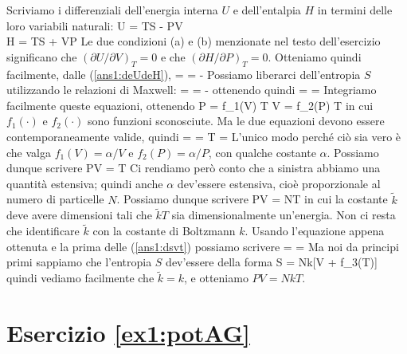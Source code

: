 Scriviamo i differenziali dell'energia interna $U$ e dell'entalpia $H$ in termini delle loro variabili naturali:
\bea
\label{ans1:deUdeH}
\de U = T\de S - P\de V \nonumber \\
\de H = T\de S + V\de P
\eea
Le due condizioni (a) e (b) menzionate nel testo dell'esercizio significano che $(\partial U/\partial V)_T = 0$ e che $(\partial H/\partial P)_T = 0$. Otteniamo quindi facilmente, dalle (\ref{ans1:deUdeH}),
\be
\label{ans1:dsvt}
 =  \quad\quad\quad {} = -
\ee
Possiamo liberarci dell'entropia $S$ utilizzando le relazioni di Maxwell:
\be
{} =  \quad\quad\quad {} = -
\ee
ottenendo quindi
\be
{} =  \quad\quad\quad {} = 
\ee
Integriamo facilmente queste equazioni, ottenendo
\be
P = f_1(V) T \quad\quad\quad V = f_2(P) T
\ee
in cui $f_1(\cdot)$ e $f_2(\cdot)$ sono funzioni sconosciute. Ma le due equazioni devono essere contemporaneamente valide, quindi
\be
{} =  = T = 
\ee
L'unico modo perché ciò sia vero è che valga $f_1(V) = \alpha/V$ e $f_2(P) = \alpha/P$, con qualche costante $\alpha$. Possiamo dunque scrivere
\be
PV = \alpha T
\ee
Ci rendiamo però conto che a sinistra abbiamo una quantità estensiva; quindi anche $\alpha$ dev'essere estensiva, cioè proporzionale al numero di particelle $N$. Possiamo dunque scrivere
\be
PV = NT
\ee
in cui la costante $\tilde{k}$ deve avere dimensioni tali che $\tilde{k}T$ sia dimensionalmente un'energia. Non ci resta che identificare $\tilde{k}$ con la costante di Boltzmann $k$. Usando l'equazione appena ottenuta e la prima delle (\ref{ans1:dsvt}) possiamo scrivere
\be
{} =  = 
\ee
Ma noi da principi primi sappiamo che l'entropia $S$ dev'essere della forma
\be
S = Nk[\ln V + f_3(T)]
\ee
quindi vediamo facilmente che $\tilde{k} = k$, e otteniamo $PV = NkT$.

%
%
\section*{Esercizio \ref{ex1:potAG}}

